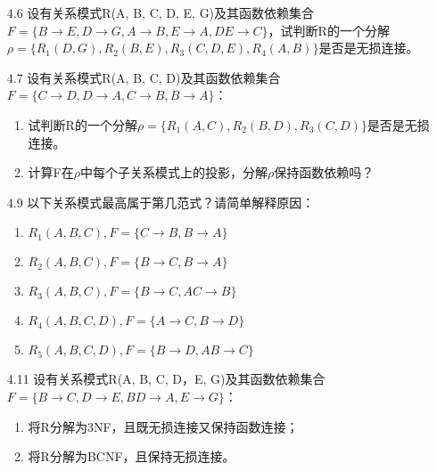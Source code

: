 \documentclass[]{ctexart}
\begin{document}
\begin{enumerate}
	\item[4.6] 设有关系模式R(A, B, C, D, E, G)及其函数依赖集合$F=\{B \to E, D \to G, A \to B, E \to A, DE \to C\}$，试判断R的一个分解$\rho=\{R_{1}(D, G), R_{2}(B, E), R_{3}(C, D, E), R_{4}(A, B)\}$是否是无损连接。
	
	\item[4.7] 设有关系模式R(A, B, C, D)及其函数依赖集合$F=\{C \to D, D \to A, C \to B, B \to A\}$：
	\begin{enumerate}
		\item 试判断R的一个分解$\rho=\{R_{1}(A, C), R_{2}(B, D), R_{3}(C, D)\}$是否是无损连接。
		\item 计算F在$\rho$中每个子关系模式上的投影，分解$\rho$保持函数依赖吗？
	\end{enumerate}

	\item[4.9] 以下关系模式最高属于第几范式？请简单解释原因：
	\begin{enumerate}
		\item $R_{1}(A, B, C), F=\{C \to B, B \to A\}$
		\item $R_{2}(A, B, C), F=\{B \to C, B \to A\}$
		\item $R_{3}(A, B, C), F=\{B \to C, AC \to B\}$
		\item $R_{4}(A, B, C, D), F=\{A \to C, B \to D\}$
		\item $R_{5}(A, B, C, D), F=\{B \to D, AB \to C\}$
	\end{enumerate}

	\item[4.11] 设有关系模式R(A, B, C, D，E, G)及其函数依赖集合$F=\{B \to C, D \to E, BD \to A, E \to G\}$：
	\begin{enumerate}
		\item 将R分解为3NF，且既无损连接又保持函数连接；
		\item 将R分解为BCNF，且保持无损连接。
	\end{enumerate}
\end{enumerate}
\end{document}

